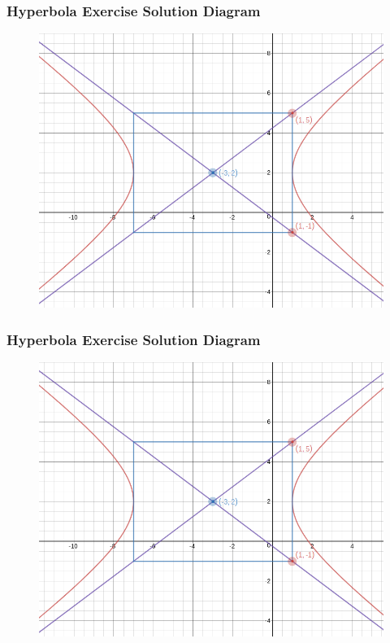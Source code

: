 \documentclass[xcolor=dvipsnames]{beamer}
\begin{document}
\begin{frame}
  \frametitle{Hyperbola Exercise Solution Diagram}
  \begin{figure}[h]
    \includegraphics[scale=.4]{./hyperbola3.png}
  \end{figure}
\end{frame}

\begin{frame}
  \frametitle{Hyperbola Exercise Solution Diagram}
  \begin{figure}[h]
    \includegraphics[scale=.4]{./hyperbola3.png}
  \end{figure}
\end{frame}
\end{document}
